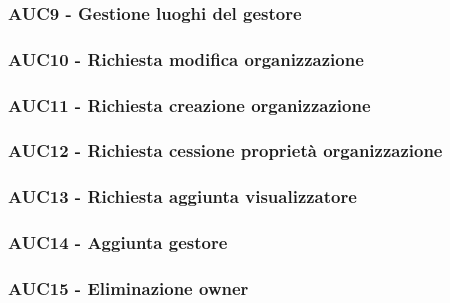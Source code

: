 \documentclass[../analisi-dei-requisiti.tex]{subfiles}
\begin{document}



\subsubsection{AUC9 - Gestione luoghi del gestore}%
\label{subs:AUC9}



\subsubsection{AUC10 - Richiesta modifica organizzazione}%
\label{subs:AUC10}



\subsubsection{AUC11 - Richiesta creazione organizzazione}%
\label{subs:AUC11}



\subsubsection{AUC12 - Richiesta cessione proprietà organizzazione}%
\label{subs:AUC12}



\subsubsection{AUC13 - Richiesta aggiunta visualizzatore}%
\label{subs:AUC13}



\subsubsection{AUC14 - Aggiunta gestore}%
\label{subs:AUC14}



\subsubsection{AUC15 - Eliminazione owner}%
\label{subs:AUC15}
\end{document}
